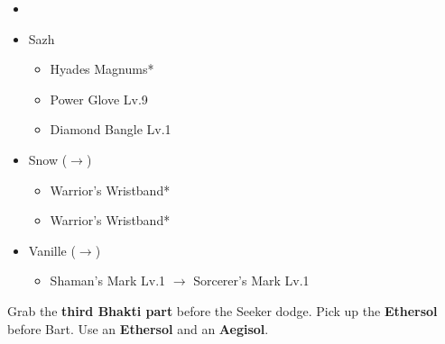 \begin{menu}
	\begin{itemize}
		\paradigm
		\begin{itemize}
			\item {}%
				  {\paradigmline{\syn}{\rav}{\sab}}%
			      {\paradigmline{\com}{\rav}{\rav}}%
			      {\paradigmline{\rav}{\sen}{\med}}%
			      {\paradigmline{\com}{(\rav)}{(\rav)}}%
			      {\paradigmline[4]{\rav}{\rav}{\sab}}%
			      {\paradigmline{\com}{\rav}{\med}}%
		\end{itemize}
		\equip
		\begin{itemize}
			\item Sazh
				\begin{itemize}
					\item Hyades Magnums*
					\item Power Glove Lv.9
					\item Diamond Bangle Lv.1
				\end{itemize}
			\item Snow ($\rightarrow$)
				\begin{itemize}
					\item Warrior's Wristband*
					\item Warrior's Wristband*
				\end{itemize}
			\item Vanille ($\rightarrow$)
				\begin{itemize}
					\item Shaman's Mark Lv.1 $\rightarrow$ Sorcerer's Mark Lv.1
				\end{itemize}				
		\end{itemize}
	\end{itemize}
\end{menu}

\renewcommand{\fourth}{[4] Relentless Assault (\com/\rav/\rav)}

Grab the \textbf{third Bhakti part} before the Seeker dodge.
Pick up the \textbf{Ethersol} before Bart.
Use an \textbf{Ethersol} and an \textbf{Aegisol}.

